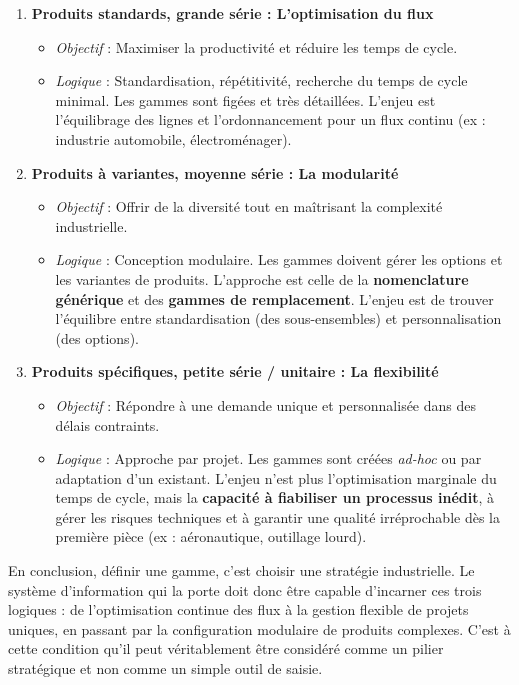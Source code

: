 \documentclass{article}
\begin{document}
\begin{enumerate}[label=\textbf{Classe \Alph*}, leftmargin=*]
    \item \textbf{Produits standards, grande série : L'optimisation du flux}
    \begin{itemize}
        \item \textit{Objectif} : Maximiser la productivité et réduire les temps de cycle.
        \item \textit{Logique} : Standardisation, répétitivité, recherche du temps de cycle minimal. Les gammes sont figées et très détaillées. L'enjeu est l'équilibrage des lignes et l'ordonnancement pour un flux continu (ex : industrie automobile, électroménager).
    \end{itemize}
    
    \item \textbf{Produits à variantes, moyenne série : La modularité}
    \begin{itemize}
        \item \textit{Objectif} : Offrir de la diversité tout en maîtrisant la complexité industrielle.
        \item \textit{Logique} : Conception modulaire. Les gammes doivent gérer les options et les variantes de produits. L'approche est celle de la \textbf{nomenclature générique} et des \textbf{gammes de remplacement}. L'enjeu est de trouver l'équilibre entre standardisation (des sous-ensembles) et personnalisation (des options).
    \end{itemize}
    
    \item \textbf{Produits spécifiques, petite série / unitaire : La flexibilité}
    \begin{itemize}
        \item \textit{Objectif} : Répondre à une demande unique et personnalisée dans des délais contraints.
        \item \textit{Logique} : Approche par projet. Les gammes sont créées \textit{ad-hoc} ou par adaptation d'un existant. L'enjeu n'est plus l'optimisation marginale du temps de cycle, mais la \textbf{capacité à fiabiliser un processus inédit}, à gérer les risques techniques et à garantir une qualité irréprochable dès la première pièce (ex : aéronautique, outillage lourd).
    \end{itemize}
\end{enumerate}

En conclusion, définir une gamme, c'est choisir une stratégie industrielle. Le système d'information qui la porte doit donc être capable d'incarner ces trois logiques : de l'optimisation continue des flux à la gestion flexible de projets uniques, en passant par la configuration modulaire de produits complexes. C'est à cette condition qu'il peut véritablement être considéré comme un pilier stratégique et non comme un simple outil de saisie.
\end{document}
